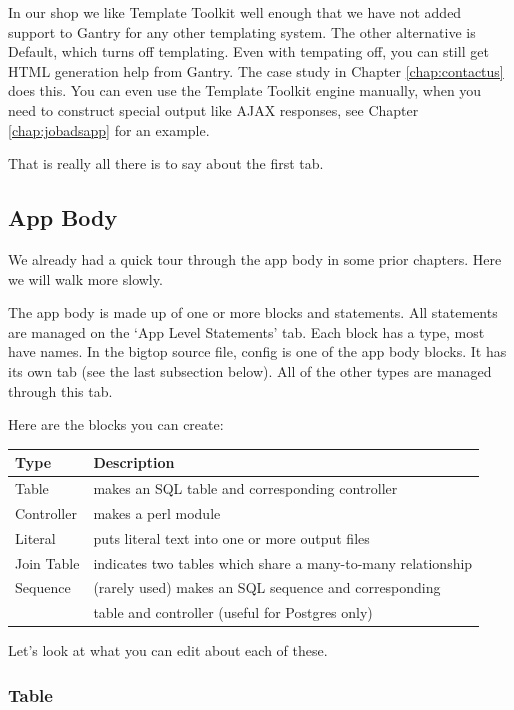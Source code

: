 In our shop we like Template Toolkit well enough that we have not added
support to Gantry for any other templating system.  The other alternative
is Default, which turns off templating.  Even with tempating off, you
can still get HTML generation help from Gantry.  The case study in
Chapter \ref{chap:contactus} does this.  You can even use the Template
Toolkit engine manually, when you need to construct special output like
AJAX responses, see Chapter \ref{chap:jobadsapp} for an example.

That is really all there is to say about the first tab.

\subsection*{App Body}

We already had a quick tour through the app body in some prior chapters.
Here we will walk more slowly.

The app body is made up of one or more blocks and statements.  All statements
are managed on the `App Level Statements' tab.  Each block has a type,
most have names.  In the bigtop source file, config is one of the app body
blocks.  It has its own tab (see the last subsection below).  All of the
other types are managed through this tab.

Here are the blocks you can create:

\begin{tabular}{l|l}
Type & Description \\
\hline
Table      & makes an SQL table and corresponding controller              \\
Controller & makes a perl module                                          \\
Literal    & puts literal text into one or more output files              \\
Join Table & indicates two tables which share a many-to-many relationship \\
Sequence   & (rarely used) makes an SQL sequence and corresponding        \\
           & table and controller (useful for Postgres only)              \\
\end{tabular}

Let's look at what you can edit about each of these.

\subsubsection*{Table}

